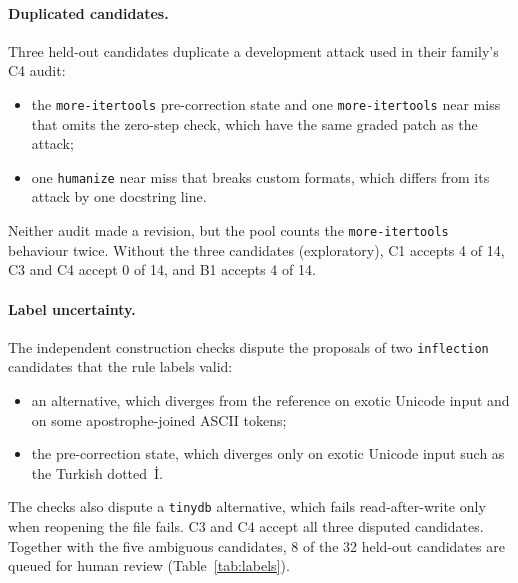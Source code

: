 \paragraph{Duplicated candidates.} Three held-out candidates duplicate a development attack used in their family's C4 audit:
\begin{itemize}
\item the \texttt{more-itertools} pre-correction state and one \texttt{more-itertools} near miss that omits the zero-step check, which have the same graded patch as the attack;
\item one \texttt{humanize} near miss that breaks custom formats, which differs from its attack by one docstring line.
\end{itemize}
Neither audit made a revision, but the pool counts the \texttt{more-itertools} behaviour twice. Without the three candidates (exploratory), C1 accepts 4 of 14, C3 and C4 accept 0 of 14, and B1 accepts 4 of 14.

\paragraph{Label uncertainty.} The independent construction checks dispute the proposals of two \texttt{inflection} candidates that the rule labels valid:
\begin{itemize}
\item an alternative, which diverges from the reference on exotic Unicode input and on some apostrophe-joined ASCII tokens;
\item the pre-correction state, which diverges only on exotic Unicode input such as the Turkish dotted~İ.
\end{itemize}
The checks also dispute a \texttt{tinydb} alternative, which fails read-after-write only when reopening the file fails. C3 and C4 accept all three disputed candidates. Together with the five ambiguous candidates, 8 of the 32 held-out candidates are queued for human review (Table~\ref{tab:labels}).


